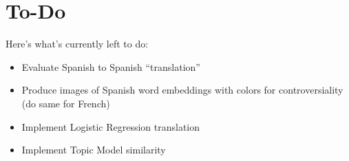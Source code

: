 \documentclass[11pt]{article} %
\begin{document}
\section{To-Do}
Here's what's currently left to do:
\begin{itemize}
\item Evaluate Spanish to Spanish ``translation''
\item Produce images of Spanish word embeddings with colors for controversiality (do same for French)
\item Implement Logistic Regression translation
\item Implement Topic Model similarity
\end{itemize}
\end{document}
